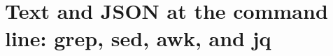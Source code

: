 \chapter{Text and JSON at the command line: grep, sed, awk, and jq}
\label{ch:text-and-json-at-the-command-line-grep}

